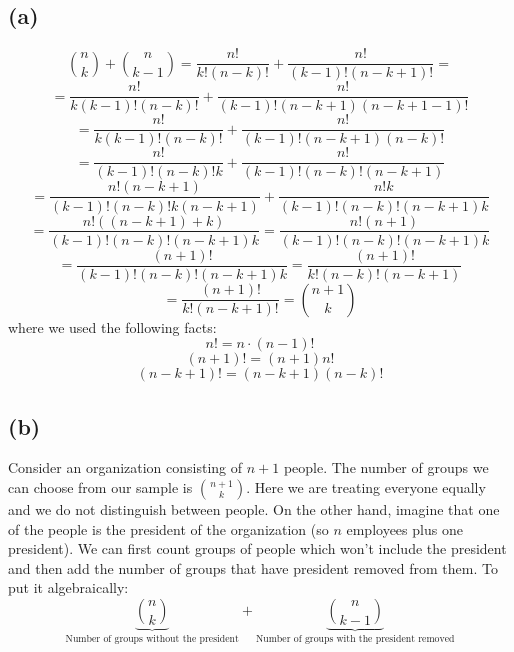 \documentclass{article}
\begin{document}
\subsection*{(a)}
\begin{equation*}
    \binom{n}{k} + \binom{n}{k-1} = \frac{n!}{k!(n-k)!} + \frac{n!}{(k-1)! (n - k + 1)!} =
\end{equation*}
\begin{equation*}
    = \frac{n!}{k(k-1)!(n-k)!} + \frac{n!}{(k-1)! (n - k + 1)(n - k + 1 - 1)!}
\end{equation*}
\begin{equation*}
    = \frac{n!}{k(k-1)!(n-k)!} + \frac{n!}{(k-1)! (n - k + 1)(n - k)!}
\end{equation*}
\begin{equation*}
    = \frac{n!}{(k-1)!(n-k)!k} + \frac{n!}{(k-1)!(n - k)!(n - k + 1)}
\end{equation*}
\begin{equation*}
    = \frac{n!(n-k+1)}{(k-1)!(n-k)!k(n-k+1)} + \frac{n!k}{(k-1)!(n - k)!(n - k + 1)k}
\end{equation*}
\begin{equation*}
    = \frac{n! ((n - k + 1) + k)}{(k-1)!(n - k)!(n - k + 1)k} = \frac{n!(n+1)}{(k-1)!(n - k)!(n - k + 1)k}
\end{equation*}
\begin{equation*}
    = \frac{(n+1)!}{(k-1)!(n - k)!(n - k + 1)k} = \frac{(n+1)!}{k!(n - k)!(n - k + 1)}
\end{equation*}
\begin{equation*}
    = \frac{(n+1)!}{k!(n - k + 1)!} = \binom{n+1}{k}
\end{equation*}
where we used the following facts:
\begin{equation*}
    n! = n \cdot (n-1)!
\end{equation*}
\begin{equation*}
    (n+1)! = (n+1)n!
\end{equation*}
\begin{equation*}
    (n -k + 1)! = (n - k + 1)(n-k)!
\end{equation*}
\subsection*{(b)}
Consider an organization consisting of \(n + 1\) people. The number of groups we can choose from our sample is \(\binom{n+1}{k}\).
Here we are treating everyone equally and we do not distinguish between people.
On the other hand, imagine that one of the people is the president of the organization (so \(n\) employees plus one president).
We can first count groups of people which won't include the president and then add the number of groups that have president
removed from them. To put it algebraically:
\begin{equation*}
   \underbrace{\binom{n}{k}}_\text{Number of groups without the president} + \underbrace{\binom{n}{k - 1}}_\text{Number of groups with the president removed}
\end{equation*}
\end{document}
